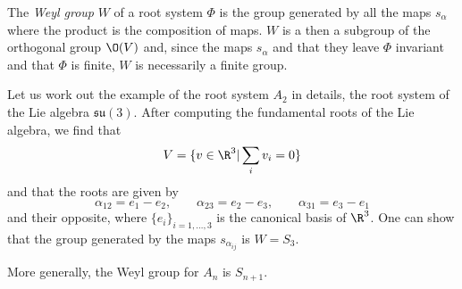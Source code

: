\documentclass{worksheetclass}
\begin{document}
    The \emph{Weyl group} $W$ of a root system $\Phi$ is the group generated by all the maps $s_\alpha$ where the product is the composition of maps. $W$ is a then a subgroup of the orthogonal group $\O(V)$ and, since the maps $s_\alpha$ and that they leave $\Phi$ invariant and that $\Phi$ is finite, $W$ is necessarily a finite group.

    \begin{examp}
        Let us work out the example of the root system $A_2$ in details, the root system of the Lie algebra $\mathfrak{su(3)}$. After computing the fundamental roots of the Lie algebra, we find that
        \begin{equation}
            V=\{v\in\R^3|\sum_i v_i=0\}
        \end{equation}
        and that the roots are given by
        \begin{equation}
            \alpha_{12}=e_1-e_2,\qquad
            \alpha_{23}=e_2-e_3,\qquad
            \alpha_{31}=e_3-e_1
        \end{equation}
        and their opposite, where $\{e_i\}_{i=1,\dots,3}$ is the canonical basis of $\R^3$. One can show that the group generated by the maps $s_{\alpha_{ij}}$ is $W=S_3$.
    \end{examp}

    More generally, the Weyl group for $A_n$ is $S_{n+1}$.



\printbibliography
\end{document}
